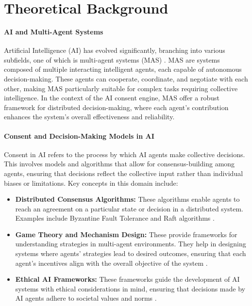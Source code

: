 \documentclass{article}
\begin{document}
\hypertarget{theoretical-background}{%
\section*{Theoretical Background}\label{theoretical-background}}

\hypertarget{ai-and-multi-agent-systems}{%
\paragraph{AI and Multi-Agent
Systems}\label{ai-and-multi-agent-systems}}

Artificial Intelligence (AI) has evolved significantly, branching into
various subfields, one of which is multi-agent systems (MAS) \cite{kraus2019ai}. MAS are systems composed of multiple
interacting intelligent agents, each capable of autonomous
decision-making. These agents can cooperate, coordinate, and negotiate
with each other, making MAS particularly suitable for complex tasks
requiring collective intelligence. In the context of the AI consent
engine, MAS offer a robust framework for distributed decision-making,
where each agent's contribution enhances the system's overall
effectiveness and reliability.

\hypertarget{consent-and-decision-making-models-in-ai}{%
\paragraph{Consent and Decision-Making Models in
AI}\label{consent-and-decision-making-models-in-ai}}

Consent in AI refers to the process by which AI agents make collective
decisions. This involves models and algorithms that allow for
consensus-building among agents, ensuring that decisions reflect the
collective input rather than individual biases or limitations. Key
concepts in this domain include:

\begin{itemize}
\item
  \textbf{Distributed Consensus Algorithms:} These algorithms enable
  agents to reach an agreement on a particular state or decision in a
  distributed system. Examples include Byzantine Fault Tolerance and
  Raft algorithms \cite{castroYear} \cite{ongaroYear}.
\item
  \textbf{Game Theory and Mechanism Design:} These provide frameworks
  for understanding strategies in multi-agent environments. They help in
  designing systems where agents' strategies lead to desired outcomes,
  ensuring that each agent's incentives align with the overall objective
  of the system \cite{wangYear}.
\item
  \textbf{Ethical AI Frameworks:} These frameworks guide the development
  of AI systems with ethical considerations in mind, ensuring that
  decisions made by AI agents adhere to societal values and norms \cite{hogenhout2020ethical}.
\end{itemize}
\end{document}
